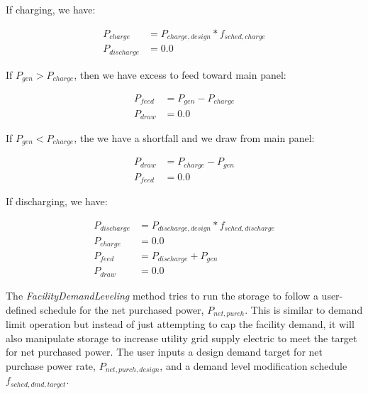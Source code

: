 If charging, we have:

\begin{equation}
  \begin{array}{rl}
    {P_{charge}} &= {P_{charge,design}} * {f_{sched,charge}} \\
    {P_{discharge}} &= 0.0
  \end{array}
\end{equation}

If ${P_{gen}} > {P_{charge}}$,  then we have excess to feed toward main panel:

\begin{equation}
  \begin{array}{rl}
    {P_{feed}} &= {P_{gen}} - {P_{charge}} \\
    {P_{draw}} &= 0.0
  \end{array}
\end{equation}

If ${P_{gen}} < {P_{charge}}$, the we have a shortfall and we draw from main panel:

\begin{equation}
  \begin{array}{rl}
    {P_{draw}} &= {P_{charge}} - {P_{gen}} \\
    {P_{feed}} &= 0.0
  \end{array}
\end{equation}

If discharging, we have:

\begin{equation}
  \begin{array}{rl}
    {P_{discharge}} &= {P_{discharge,design}} * {f_{sched,discharge}} \\
    {P_{charge}} &= 0.0 \\
    {P_{feed}} &= {P_{discharge}} + {P_{gen}} \\
    {P_{draw}} &= 0.0
  \end{array}
\end{equation}

The \emph{FacilityDemandLeveling} method tries to run the storage to follow a user-defined schedule for the net purchased power, ${P_{net,purch}}$.  This is similar to demand limit operation but instead of just attempting to cap the facility demand, it will also manipulate storage to increase utility grid supply electric to meet the target for net purchased power.  The user inputs a design demand target for net purchase power rate, ${P_{net,purch,design}} $, and a demand level modification schedule ${f_{sched,dmd,target}}$.  

